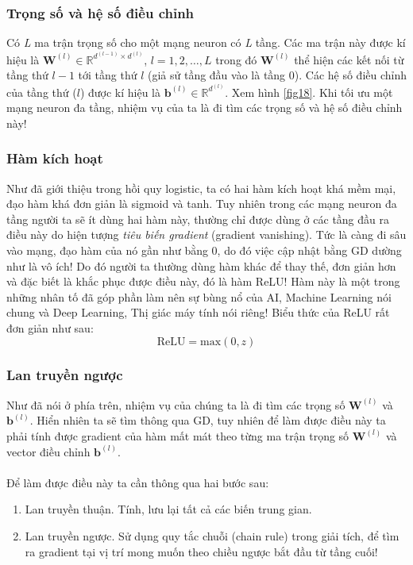 \documentclass{article}
\begin{document}
\subsubsection*{Trọng số và hệ số điều chỉnh}
Có \textit{L} ma trận trọng số cho một mạng neuron có \textit{L} tầng. Các ma trận này được kí hiệu là $\textbf{W}^{(l)} \in \mathbb{R}^{d^{(l-1)}\times d^{(l)}}$, $l = 1,2,\ldots, L$ trong đó $\textbf{W}^{(l)}$ thể hiện các kết nối từ tầng thứ $l-1$ tới tầng thứ $l$ (giả sử tầng đầu vào là tầng 0). Các hệ số điều chỉnh của tầng thứ ($l$) được kí hiệu là $\textbf{b}^{(l)} \in \mathbb{R}^{d^{(l)}}$. Xem hình \ref{fig18}. Khi tối ưu một mạng neuron đa tầng, nhiệm vụ của ta là đi tìm các trọng số và hệ số điều chỉnh này!
\subsubsection{Hàm kích hoạt}
Như đã giới thiệu trong hồi quy logistic, ta có hai hàm kích hoạt khá mềm mại, đạo hàm khá đơn giản là sigmoid và tanh. Tuy nhiên trong các mạng neuron đa tầng người ta sẽ ít dùng hai hàm này, thường chỉ được dùng ở các tầng đầu ra điều này do hiện tượng \textit{tiêu biến gradient } (gradient vanishing). Tức là càng đi sâu vào mạng, đạo hàm của nó gần như bằng 0, do đó việc cập nhật bằng GD dường như là vô ích! Do đó người ta thường dùng hàm khác để thay thế, đơn giản hơn và đặc biết là khắc phục được điều này, đó là hàm ReLU! Hàm này là một trong những nhân tố đã góp phần làm nên sự bùng nổ của AI, Machine Learning nói chung và Deep Learning, Thị giác máy tính nói riêng! Biểu thức của ReLU rất đơn giản như sau:
\begin{equation}
    \text{ReLU} = \text{max}(0, z)
    \label{eq40}
\end{equation}
\subsubsection{Lan truyền ngược}
Như đã nói ở phía trên, nhiệm vụ của chúng ta là đi tìm các trọng số $\textbf{W}^{(l)}$ và $\textbf{b}^{(l)}$. Hiển nhiên ta sẽ tìm thông qua GD, tuy nhiên để làm được điều này ta phải tính được gradient của hàm mất mát theo từng ma trận trọng số $\textbf{W}^{(l)}$ và vector điều chỉnh $\textbf{b}^{(l)}$.\\\\
Để làm được điều này ta cần thông qua hai bước sau:
\begin{enumerate}
    \item Lan truyền thuận. Tính, lưu lại tất cả các biến trung gian.
    \item Lan truyền ngược. Sử dụng quy tắc chuỗi (chain rule) trong giải tích, để tìm ra gradient tại vị trí mong muốn theo chiều ngược bắt đầu từ tầng cuối!
\end{enumerate}
\end{document}
